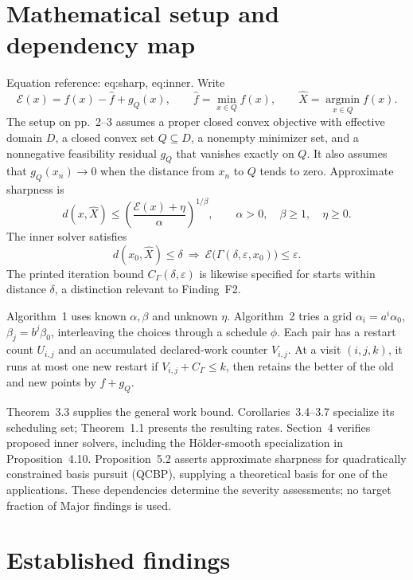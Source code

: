 \documentclass[10pt]{article}
\begin{document}
\section*{Mathematical setup and dependency map}
Equation reference: eq:sharp, eq:inner. Write \[\mathcal E(x)=f(x)-\widehat f+g_Q(x),\qquad
 \widehat f=\min_{x\in Q}f(x),\qquad \widehat X=\operatorname*{argmin}_{x\in Q}f(x).\] The setup on pp. 2–3 assumes a proper closed convex objective with effective domain \(D\), a closed convex set \(Q\subseteq D\), a nonempty minimizer set, and a nonnegative feasibility residual \(g_Q\) that vanishes exactly on \(Q\). It also assumes that \(g_Q(x_n)\to0\) when the distance from \(x_n\) to \(Q\) tends to zero. Approximate sharpness is \[
 d(x,\widehat X)\le
 \left(\frac{\mathcal E(x)+\eta}{\alpha}\right)^{1/\beta},
 \qquad \alpha>0,\quad\beta\ge1,\quad\eta\ge0.\] The inner solver satisfies \[
 d(x_0,\widehat X)\le\delta
 \ \Longrightarrow\
 \mathcal E\bigl(\Gamma(\delta,\varepsilon,x_0)\bigr)\le\varepsilon .\] The printed iteration bound \(C_\Gamma(\delta,\varepsilon)\) is likewise specified for starts within distance \(\delta\), a distinction relevant to Finding F2.\par
Algorithm 1 uses known \(\alpha,\beta\) and unknown \(\eta\). Algorithm 2 tries a grid \(\alpha_i=a^i\alpha_0\), \(\beta_j=b^j\beta_0\), interleaving the choices through a schedule \(\phi\). Each pair has a restart count \(U_{i,j}\) and an accumulated declared-work counter \(V_{i,j}\). At a visit \((i,j,k)\), it runs at most one new restart if \(V_{i,j}+C_\Gamma\le k\), then retains the better of the old and new points by \(f+g_Q\).\par
Theorem 3.3 supplies the general work bound. Corollaries 3.4–3.7 specialize its scheduling set; Theorem 1.1 presents the resulting rates. Section 4 verifies proposed inner solvers, including the Hölder-smooth specialization in Proposition 4.10. Proposition 5.2 asserts approximate sharpness for quadratically constrained basis pursuit (QCBP), supplying a theoretical basis for one of the applications. These dependencies determine the severity assessments; no target fraction of Major findings is used.\par
\section*{Established findings}
\end{document}
